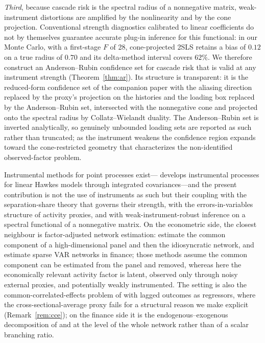\documentclass[12pt]{article}
\theoremstyle{plain}\newtheorem{theorem}{Theorem}[section]\newtheorem{proposition}[theorem]{Proposition}\newtheorem{lemma}[theorem]{Lemma}\newtheorem{corollary}[theorem]{Corollary}
\theoremstyle{definition}\newtheorem{definition}[theorem]{Definition}\newtheorem{assumption}[theorem]{Assumption}\newtheorem{remark}[theorem]{Remark}
\begin{document}
\emph{Third}, because cascade risk is the spectral radius of a nonnegative matrix, weak-instrument distortions are amplified by the nonlinearity and by the cone projection. Conventional strength diagnostics calibrated to linear coefficients \citep{stockyogo2005,montielolea2013} do not by themselves guarantee accurate plug-in inference for this functional: in our Monte Carlo, with a first-stage $F$ of 28, cone-projected 2SLS retains a bias of $0.12$ on a true radius of $0.70$ and its delta-method interval covers $62\%$. We therefore construct an Anderson--Rubin confidence set \citep{anderson1949,kleibergen2002,andrews2019} for cascade risk that is valid at any instrument strength (Theorem~\ref{thm:ar}). Its structure is transparent: it is the reduced-form confidence set of the companion paper with the aliasing direction replaced by the proxy's projection on the histories and the loading box replaced by the Anderson--Rubin set, intersected with the nonnegative cone and projected onto the spectral radius by Collatz--Wielandt duality. The Anderson--Rubin set is inverted analytically, so genuinely unbounded loading sets are reported as such rather than truncated; as the instrument weakens the confidence region expands toward the cone-restricted geometry that characterizes the non-identified observed-factor problem.

Instrumental methods for point processes exist---\citet{mogensen2023} develops instrumental processes for linear Hawkes models through integrated covariances---and the present contribution is not the use of instruments as such but their coupling with the separation-share theory that governs their strength, with the errors-in-variables structure of activity proxies, and with weak-instrument-robust inference on a spectral functional of a nonnegative matrix. On the econometric side, the closest neighbour is factor-adjusted network estimation: \citet{barigozzi2023fnets} estimate the common component of a high-dimensional panel and then the idiosyncratic network, and \citet{barigozzi2019} estimate sparse VAR networks in finance; those methods assume the common component can be estimated from the panel and removed, whereas here the economically relevant activity factor is latent, observed only through noisy external proxies, and potentially weakly instrumented. The setting is also the common-correlated-effects problem of \citet{pesaran2006} with lagged outcomes as regressors, where the cross-sectional-average proxy fails for a structural reason we make explicit (Remark~\ref{rem:cce}); on the finance side it is the endogenous--exogenous decomposition of \citet{filimonov2015} and \citet{wheatley2019} at the level of the whole network rather than of a scalar branching ratio.
\end{document}
